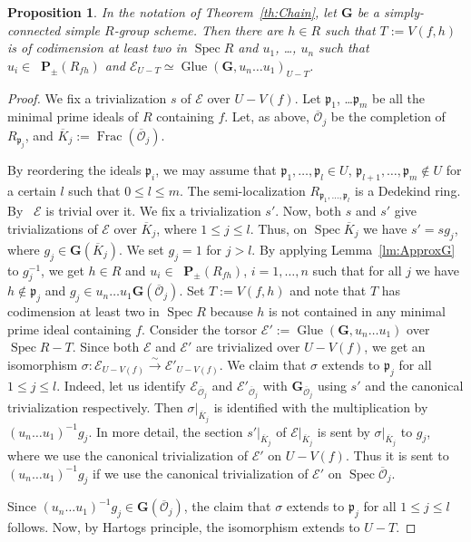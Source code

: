 \documentclass[11pt]{amsart}
\DeclareMathOperator\Ru{R_u}
\DeclareMathOperator\Glue{{Glue}}
\DeclareMathOperator\Spec{{Spec}}
\DeclareMathOperator{\Frac}{Frac}
\theoremstyle{plain}
\newtheorem{proposition}{Proposition}[section]
\theoremstyle{definition}
\theoremstyle{remark}
\newcommand\fp{{\mathfrak{p}}}
\newcommand\cE{{\mathcal{E}}}
\newcommand\cO{{\mathcal{O}}}
\newcommand\bG{{\mathbf G}}
\newcommand\bP{{\mathbf P}}
\begin{document}
\begin{proposition}\label{pr:Away2Div}
  In the notation of Theorem~\ref{th:Chain}, let $\bG$ be a simply-connected simple $R$-group scheme. Then there are $h\in R$ such that $T:=V(f,h)$ is of codimension at least two in $\Spec R$ and $u_1$, \ldots, $u_n$ such that $u_i\in \Ru\bP_\pm(R_{fh})$ and $\cE_{U-T}\simeq\Glue(\bG,u_n\ldots u_1)_{U-T}$.
\end{proposition}
\begin{proof}
We fix a trivialization $s$ of $\cE$ over $U-V(f)$. Let $\fp_1$, \ldots $\fp_m$ be all the minimal prime ideals of $R$ containing $f$. Let, as above, $\overline\cO_j$ be the completion of $R_{\fp_j}$, and $\overline K_j:=\Frac(\overline\cO_j)$.

By reordering the ideals $\fp_i$, we may assume that $\fp_1,\ldots,\fp_l\in U$, $\fp_{l+1},\ldots,\fp_m\notin U$ for a certain $l$ such that $0\le l\le m$. The semi-localization $R_{\fp_1,\ldots,\fp_l}$ is a Dedekind ring. By~\cite{Guo2019GrSerreDedekind} $\cE$ is trivial over it. We fix a trivialization $s'$. Now, both $s$ and $s'$ give trivializations of $\cE$ over $\overline K_j$, where $1\le j\le l$. Thus, on $\Spec\overline K_j$ we have $s'=sg_j$, where $g_j\in\bG(\overline K_j)$. We set $g_j=1$ for $j>l$. By applying Lemma~\ref{lm:ApproxG} to $g_j^{-1}$, we get $h\in R$ and $u_i\in\Ru\bP_\pm(R_{fh})$, $i=1,\ldots,n$ such that for all $j$ we have $h\notin\fp_j$ and $g_j\in u_n\ldots u_1\bG(\overline\cO_j)$. Set $T:=V(f,h)$ and note that $T$ has codimension at least two in $\Spec R$ because $h$ is not contained in any minimal prime ideal containing $f$. Consider the torsor $\cE':=\Glue(\bG,u_n\ldots u_1)$ over $\Spec R-T$. Since both $\cE$ and $\cE'$ are trivialized over $U-V(f)$, we get an isomorphism $\sigma\colon\cE_{U-V(f)}\xrightarrow{\sim}\cE'_{U-V(f)}$. We claim that $\sigma$ extends to $\fp_j$ for all $1\le j\le l$. Indeed, let us identify $\cE_{\overline\cO_j}$ and $\cE'_{\overline\cO_j}$ with $\bG_{\overline\cO_j}$ using $s'$ and the canonical trivialization respectively. Then $\sigma|_{\overline K_j}$ is identified with the multiplication by $(u_n\ldots u_1)^{-1}g_j$. In more detail, the section $s'|_{\overline K_j}$ of $\cE|_{\overline K_j}$ is sent by $\sigma|_{\overline K_j}$ to $g_j$, where we use the canonical trivialization of $\cE'$ on $U-V(f)$. Thus it is sent to $(u_n\ldots u_1)^{-1}g_j$ if we use the canonical trivialization of $\cE'$ on $\Spec\overline\cO_j$.

Since $(u_n\ldots u_1)^{-1}g_j\in\bG(\overline\cO_j)$, the claim that $\sigma$ extends to $\fp_j$ for all $1\le j\le l$ follows. Now, by Hartogs principle, the isomorphism extends to $U-T$.
\end{proof}
\end{document}
